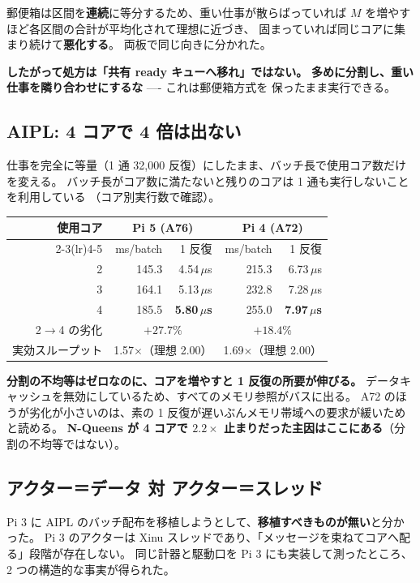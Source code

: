 \documentclass[a4paper,11pt]{ltjsarticle}
\begin{document}
\noindent
郵便箱は区間を\textbf{連続}に等分するため、重い仕事が散らばっていれば
$M$ を増やすほど各区間の合計が平均化されて理想に近づき、
固まっていれば同じコアに集まり続けて\textbf{悪化する}。
両板で同じ向きに分かれた。

\textbf{したがって処方は「共有 ready キューへ移れ」ではない。}
\textbf{多めに分割し、重い仕事を隣り合わせにするな} ---- これは郵便箱方式を
保ったまま実行できる。

\subsection{AIPL: 4 コアで 4 倍は出ない}
仕事を完全に等量（1 通 32{,}000 反復）にしたまま、バッチ長で使用コア数だけを変える。
バッチ長がコア数に満たないと残りのコアは 1 通も実行しないことを利用している
（コア別実行数で確認）。

\begin{center}
\begin{tabular}{rrrrr}
\toprule
使用コア & \multicolumn{2}{c}{Pi 5 (A76)} & \multicolumn{2}{c}{Pi 4 (A72)} \\
\cmidrule(lr){2-3}\cmidrule(lr){4-5}
 & ms/batch & 1 反復 & ms/batch & 1 反復 \\
\midrule
2 & 145.3 & 4.54\,$\mu$s & 215.3 & 6.73\,$\mu$s \\
3 & 164.1 & 5.13\,$\mu$s & 232.8 & 7.28\,$\mu$s \\
4 & 185.5 & \textbf{5.80\,$\mu$s} & 255.0 & \textbf{7.97\,$\mu$s} \\
\midrule
2$\to$4 の劣化 & \multicolumn{2}{c}{\textbf{$+27.7\%$}} & \multicolumn{2}{c}{\textbf{$+18.4\%$}} \\
実効スループット & \multicolumn{2}{c}{1.57$\times$（理想 2.00）} & \multicolumn{2}{c}{1.69$\times$（理想 2.00）} \\
\bottomrule
\end{tabular}
\end{center}

\noindent
\textbf{分割の不均等はゼロなのに、コアを増やすと 1 反復の所要が伸びる。}
データキャッシュを無効にしているため、すべてのメモリ参照がバスに出る。
A72 のほうが劣化が小さいのは、素の 1 反復が遅いぶんメモリ帯域への要求が緩いためと読める。
\textbf{N-Queens が 4 コアで $2.2\times$ 止まりだった主因はここにある}（分割の不均等ではない）。

\subsection{アクター＝データ 対 アクター＝スレッド}
Pi 3 に AIPL のバッチ配布を移植しようとして、\textbf{移植すべきものが無い}と分かった。
Pi 3 のアクターは Xinu スレッドであり、「メッセージを束ねてコアへ配る」段階が存在しない。
同じ計器と駆動口を Pi 3 にも実装して測ったところ、2 つの構造的な事実が得られた。
\end{document}
